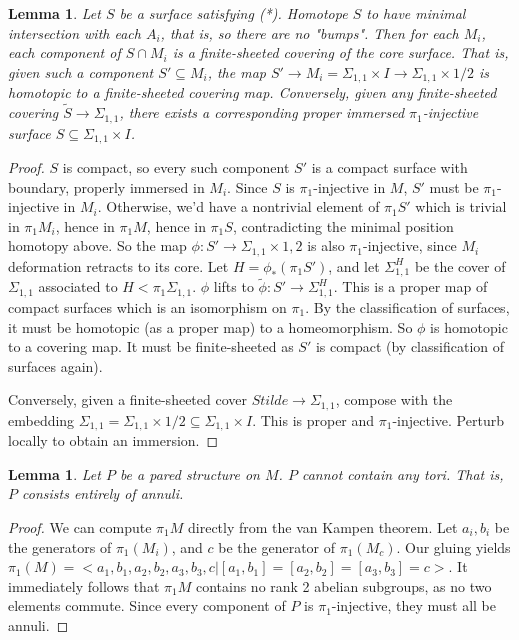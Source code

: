 \documentclass[12pt]{amsart}
\newtheorem{lemma}[theorem]{Lemma}
\theoremstyle{definition}
\newcommand{\x}{\times}
\newcommand{\Si}{\Sigma}
\newcommand{\cin}{\subseteq}
\begin{document}
\begin{lemma}

Let $S$ be a surface satisfying (*). Homotope
$S$ to have minimal intersection with each $A_i$, that is, so there are no "bumps".
Then for each $M_i$, each component of $S \cap M_i$ is a finite-sheeted covering
of the core surface. That is, given such a component $S' \cin M_i$, the map $S'
\to M_i = \Si_{1,1}\x I \to \Si_{1,1}\x{1/2}$ is homotopic to a finite-sheeted covering
map. Conversely, given any finite-sheeted covering $\widetilde{S} \to \Si_{1,1}$, there
exists a corresponding proper immersed $\pi_1$-injective surface $S \cin \Si_{1,1}\x I$.

\end{lemma}
\begin{proof}

$S$ is compact, so every such component $S'$ is a compact surface with
boundary, properly immersed in $M_i$. Since $S$ is $\pi_1$-injective in $M$, $S'$ must be
$\pi_1$-injective in $M_i$. Otherwise, we'd have a nontrivial element of $\pi_1S'$ which
is trivial in $\pi_1M_i$, hence in $\pi_1M$, hence in $\pi_1S$, contradicting the minimal
position homotopy above. So the map $\phi : S'\to\Si_{1,1}\x{1,2}$ is also $\pi_1$-injective,
since $M_i$ deformation retracts to its core. Let $H = \phi_*(\pi_1S')$, and let
$\Si_{1,1}^H$
be the cover of $\Si_{1,1}$ associated to $H<\pi_1\Si_{1,1}$. $\phi$ lifts to
$\widetilde{\phi}\colon S'\to
\Si_{1,1}^H$. This is a proper map of compact surfaces which is an isomorphism
on $\pi_1$.
By the classification of surfaces, it must be homotopic (as a proper map) to
a homeomorphism. So $\phi$ is homotopic to a covering map. It must be
finite-sheeted as $S'$ is compact (by classification of surfaces again).

Conversely, given a finite-sheeted cover $Stilde \to \Si_{1,1}$, compose with the
embedding $\Si_{1,1} = \Si_{1,1}\x{1/2} \cin \Si_{1,1}\x I$. This is proper and $\pi_1$-injective.
Perturb locally to obtain an immersion.

\end{proof}

\begin{lemma}

Let $P$ be a pared structure on $M$. $P$ cannot contain any tori. That is,
$P$ consists entirely of annuli.

\end{lemma}
\begin{proof}

We can compute $\pi_1M$ directly from the van Kampen theorem. Let $a_i,b_i$ be
the generators of $\pi_1(M_i)$, and $c$ be the generator of $\pi_1(M_c)$. Our gluing yields
$\pi_1(M) = <a_1,b_1,a_2,b_2,a_3,b_3,c| [a_1,b_1]=[a_2,b_2]=[a_3,b_3]=c>$. It immediately
follows that $\pi_1M$ contains no rank 2 abelian subgroups, as no two elements
commute. Since every component of $P$ is $\pi_1$-injective, they must all be annuli.

\end{proof}
\end{document}
